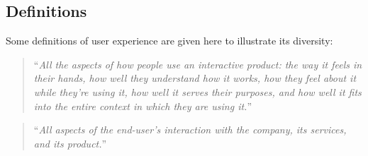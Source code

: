 \documentclass[a4paper,titlepage]{article}
\begin{document}
\subsection{Definitions}
Some definitions of user experience are given here to illustrate its
diversity:
\begin{quote}
  ``{\it All the aspects of how people use an interactive product: the
    way it feels in their hands, how well they understand how it
    works, how they feel about it while they're using it, how well it
    serves their purposes, and how well it fits into the entire
    context in which they are using it.}''

  \raggedleft \citet{experience:alben}
\end{quote}

\begin{quote}
  ``{\it All aspects of the end-user's interaction with the company, its
    services, and its product.}''

  \raggedleft \citet{experience:nielsen}
\end{quote}
\end{document}
